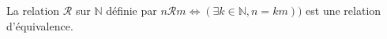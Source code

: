 La relation $\mathcal R$ sur $\mathbb N$ définie par $n\mathcal R m \iff (\exists k\in\mathbb N,n=km))$ est une relation d'équivalence.

\begin{reponses}
\end{reponses}


